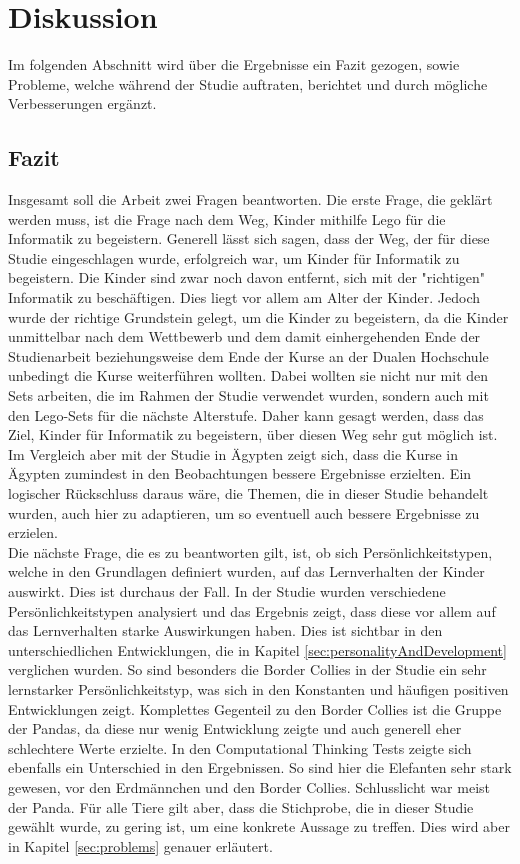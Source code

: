 \chapter{Diskussion}
Im folgenden Abschnitt wird über die Ergebnisse ein Fazit gezogen, sowie Probleme, welche während der Studie auftraten, berichtet und durch mögliche Verbesserungen ergänzt.
\section{Fazit}

Insgesamt soll die Arbeit zwei Fragen beantworten. Die erste Frage, die geklärt werden muss, ist die Frage nach dem Weg, Kinder mithilfe \gls{Lego} für die Informatik zu begeistern. Generell lässt sich sagen, dass der Weg, der für diese Studie eingeschlagen wurde, erfolgreich war, um Kinder für Informatik zu begeistern. Die Kinder sind zwar noch davon entfernt, sich mit der "richtigen" Informatik zu beschäftigen. Dies liegt vor allem am Alter der Kinder. Jedoch wurde der richtige Grundstein gelegt, um die Kinder zu begeistern, da die Kinder unmittelbar nach dem Wettbewerb und dem damit einhergehenden Ende der Studienarbeit beziehungsweise dem Ende der Kurse an der Dualen Hochschule unbedingt die Kurse weiterführen wollten. Dabei wollten sie nicht nur mit den Sets arbeiten, die im Rahmen der Studie verwendet wurden, sondern auch mit den Lego-Sets für die nächste Alterstufe. Daher kann gesagt werden, dass das Ziel, Kinder für Informatik zu begeistern, über diesen Weg sehr gut möglich ist.\\
Im Vergleich aber mit der Studie in Ägypten zeigt sich, dass die Kurse in Ägypten zumindest in den Beobachtungen bessere Ergebnisse erzielten. Ein logischer Rückschluss daraus wäre, die Themen, die in dieser Studie behandelt wurden, auch hier zu adaptieren, um so eventuell auch bessere Ergebnisse zu erzielen.\\


Die nächste Frage, die es zu beantworten gilt, ist, ob sich Persönlichkeitstypen, welche in den Grundlagen definiert wurden, auf das Lernverhalten der Kinder auswirkt. Dies ist durchaus der Fall. In der Studie wurden verschiedene Persönlichkeitstypen analysiert und das Ergebnis zeigt, dass diese vor allem auf das Lernverhalten starke Auswirkungen haben. Dies ist sichtbar in den unterschiedlichen Entwicklungen, die in Kapitel \ref{sec:personalityAndDevelopment} verglichen wurden. So sind besonders die Border Collies in der Studie ein sehr lernstarker Persönlichkeitstyp, was sich in den Konstanten und häufigen positiven Entwicklungen zeigt. Komplettes Gegenteil zu den Border Collies ist die Gruppe der Pandas, da diese nur wenig Entwicklung zeigte und auch generell eher schlechtere Werte erzielte. In den Computational Thinking Tests zeigte sich ebenfalls ein Unterschied in den Ergebnissen. So sind hier die Elefanten sehr stark gewesen, vor den Erdmännchen und den Border Collies. Schlusslicht war meist der Panda. Für alle Tiere gilt aber, dass die Stichprobe, die in dieser Studie gewählt wurde, zu gering ist, um eine konkrete Aussage zu treffen. Dies wird aber in Kapitel \ref{sec:problems} genauer erläutert.


